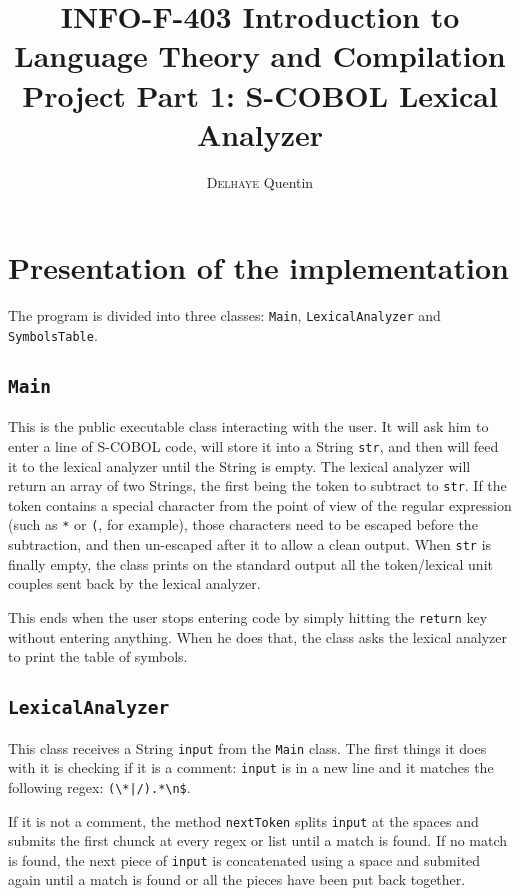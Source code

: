 \documentclass[a4paper,11pt]{article}
\title{INFO-F-403 Introduction to Language Theory and Compilation\\Project Part 1: \textsc{S-COBOL} Lexical Analyzer}
\author{\textsc{Delhaye} Quentin}
\begin{document}
\maketitle

\section{Presentation of the implementation}
The program is divided into three classes: \texttt{Main}, \texttt{LexicalAnalyzer} and \texttt{SymbolsTable}.
\subsection{\texttt{Main}}
This is the public executable class interacting with the user. It will ask him to enter a line
of \textsc{S-COBOL} code, will store it into a String \texttt{str}, and then will feed it to the lexical analyzer until
the String is empty. The lexical analyzer will return an array of two Strings, the first being the token to subtract
to \texttt{str}. If the token contains a special character from the point of view of the regular expression
(such as \texttt{*} or \texttt{(}, for example), those characters need to be escaped before the subtraction, and then
un-escaped after it to allow a clean output.
When \texttt{str} is finally empty, the class prints on the standard output all the token/lexical unit couples
sent back by the lexical analyzer.

This ends when the user stops entering code by simply hitting the \texttt{return} key
without entering anything. When he does that, the class asks the lexical analyzer to print the table
of symbols.

\subsection{\texttt{LexicalAnalyzer}}
This class receives a String \texttt{input} from the \texttt{Main} class. The first things it does with it
is checking if it is a comment: \texttt{input} is in a new line and it matches the following regex:
\verb|(\*|\texttt{|}\verb|/).*\n$|.

If it is not a comment, the method \texttt{nextToken} splits \texttt{input} at the spaces and submits the first
chunck at every regex or list until a match is found. If no match is found, the next piece of \texttt{input}
is concatenated using a space and submited again until a match is found or all the pieces have been put back
together.
\end{document}
